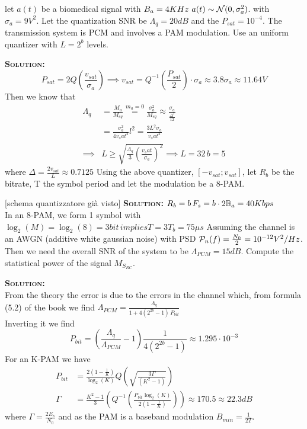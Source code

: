 \begin{exercize}[1]
  let $a(t)$ be a biomedical signal with $B_a = 4KHz \, \, a(t)\sim \N(0,\sigma_a^2)$. with $\sigma_a = 9V^2$. Let the quantization SNR  be $\Lambda_q = 20dB$ and the $P_{sat} = 10^{-4}$. The transmission system is PCM and involves a PAM modulation.
  \proofpart
  Use an uniform quantizer with $L=2^b$ levels.

  \textsc{\textbf{Solution:}}
  \begin{equation}
    P_{sat} = 2 Q\left(\frac{v_{sat}}{\sigma_a}\right) \implies v_{sat} = Q^{-1}\left(\frac{P_{sat}}{2}\right)\cdot \sigma_a \approx 3.8 \sigma_a \approx 11.64V
  \end{equation}
  Then we know that
  \begin{equation}\begin{split}
    \Lambda_q &= \frac{M_a}{M_{eq}} \stackrel{m_a=0}{=} \frac{\sigma_a^2}{M_{eq}} \approx \frac{\sigma_a}{\frac{\Delta^2}{12}} \\
    &= \frac{\sigma_a^2}{4 v_sat^2}l^2 = \frac{3 L^2 \sigma_a}{v_sat^2} \\
    \implies & L \ge \sqrt{\frac{\Lambda_q}{3}\left(\frac{v_sat}{\sigma_a}\right)^2} \implies L=32 \, b=5
    \end{split}\end{equation}
    where $\Delta = \frac{2v_{sat}}{L} \approx 0.7125$
  \proofpart
  Using the above quantizer, $[-v_{sat};v_{sat}]$, let $R_b$ be the bitrate, T the symbol period and let the modulation be a 8-PAM.

  [schema quantizzatore già visto]
  \textsc{\textbf{Solution:}}
  $R_b = b \, F_s = b \cdot 2\B_a = 40Kbps$
  \\
  In an 8-PAM, we form 1 symbol with $\log_2(M)=\log_2(8)=3 bit\, implies T=3T_b = 75\mu s$
 \proofpart
 Assuming the channel is an AWGN (additive white gaussian noise) with PSD $\P_n(f) = \frac{N_0}{2} = 10^{-12}V^2/Hz$. Then we need the overall SNR of the system to be $\Lambda_{PCM} = 15dB$. Compute the statistical power of the signal $M_{S_{RC}}$.

 \textsc{\textbf{Solution:}}\\
From the theory the error is due to the errors in the channel which, from formula (5.2) of the book we find
$\Lambda_{PCM} = \frac{\Lambda_q}{1+4\left(2^{2b}-1\right)\, P_{bit}}$
\\
Inverting it we find
\begin{equation}
  P_{bit} = \left(\frac{\Lambda_q}{\Lambda_{PCM}}-1\right) \frac{1}{4(2^{2b}-1)} \approx 1.295 \cdot 10^{-3}
\end{equation}
For an K-PAM we have
\begin{equation}\begin{split}
  P_{bit} &= \frac{2\left(1-\frac{1}{K}\right)}{\log_2(K)} Q\left(\sqrt{\frac{3 \Gamma}{(K^2 -1)}}\right)\\
  \Gamma &= \frac{K^2 -1}{3}(Q^{-1}(\frac{P_{bit} \log_2(K)}{2 (1-\frac{1}{K})}))\approx 170.5 \approx 22.3dB
\end{split}\end{equation}
where $\Gamma = \frac{2 E_s}{N_0}$ and as the PAM is a baseband modulation $B_{min} = \frac{1}{2T}$.


\end{exercize}
